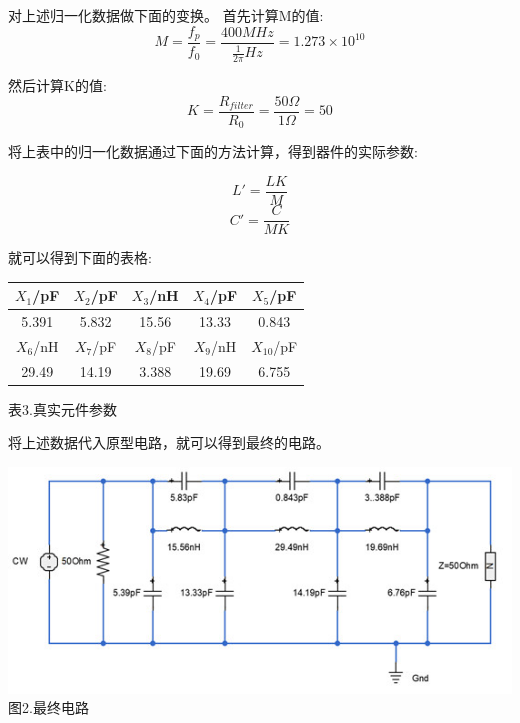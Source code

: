 \documentclass{article}
\begin{document}
\begin{CJK}{UTF8}{gbsn}
对上述归一化数据做下面的变换。 首先计算M的值:
\[
M = \frac{f_p}{f_0} = \frac{400MHz}{\frac{1}{2 \pi}Hz} = 1.273 \times 10^{10}
\]

然后计算K的值:
\[
K = \frac{R_{filter}}{R_0}=\frac{50 \Omega}{1 \Omega}=50
\]

将上表中的归一化数据通过下面的方法计算，得到器件的实际参数:

\[
L'=\frac{LK}{M}
\]
\[
C' = \frac{C}{MK}
\]

就可以得到下面的表格:

\begin{center}

\begin{tabular}{c | c | c | c | c }

\(X_1\)/pF & \(X_2\)/pF & \(X_3\)/nH & \(X_4\)/pF & \(X_5\)/pF \\
\hline
5.391 & 5.832 & 15.56 & 13.33 & 0.843 \\
\hline
\(X_6\)/nH & \(X_7\)/pF & \(X_8\)/pF & \(X_9\)/nH & \(X_{10}\)/pF \\
\hline
29.49 & 14.19 & 3.388 & 19.69 & 6.755 \\
\end{tabular}


表3.真实元件参数
\end{center}

将上述数据代入原型电路，就可以得到最终的电路。

\begin{center}
\includegraphics[scale=0.6]{final_circuits}
图2.最终电路
\end{center}


\end{CJK}
\end{document}
